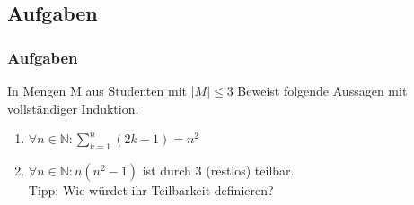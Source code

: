 \subsection{Aufgaben}
\begin{frame}
  \frametitle{Aufgaben}
  \begin{exampleblock}{In Mengen M aus Studenten mit $|M| \leq 3$}
    Beweist folgende Aussagen mit vollständiger Induktion.
    \begin{enumerate}
      \item $\forall n \in \mathbb{N}: \sum \limits^{n}_{k=1}(2k-1) = n^2$
      \item $\forall n \in \mathbb{N}: n(n^2-1)$ ist durch 3 (restlos) teilbar.\\
        {\tiny Tipp: Wie würdet ihr Teilbarkeit definieren?}
    \end{enumerate}
  \end{exampleblock}
\end{frame}